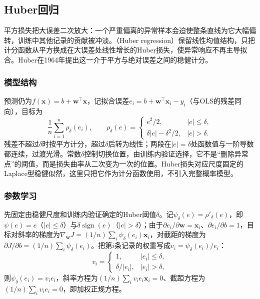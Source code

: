 \subsection{Huber回归}
\label{sec:regression-huber}

平方损失把大误差二次放大：一个严重偏离的异常样本会迫使整条直线为它大幅偏转，训练中其他记录的贡献被冲淡。（Huber regression）保留线性均值结构，只把计分函数从平方换成在大误差处线性增长的Huber损失，使异常响应不再主导拟合。Huber在1964年提出这一介于平方与绝对误差之间的稳健计分。

\subsubsection{模型结构}
\label{sec:regression-huber-structure}

预测仍为$f(\bm{x})=b+\bm{w}^{\top}\bm{x}$，记拟合误差$e_i=b+\bm{w}^{\top}\bm{x}_i-y_i$（与OLS的残差同向），目标为
\begin{equation}
  \frac{1}{n}\sum_{i=1}^n\rho_\delta(e_i),
  \qquad
  \rho_\delta(e)=
  \begin{cases}
    e^2/2,&|e|\leq\delta,\\
    \delta|e|-\delta^2/2,&|e|>\delta.
  \end{cases}
  \label{eq:regression-huber-loss}
\end{equation}
残差不超过$\delta$时按平方计分，超过$\delta$后转为线性；两段在$|e|=\delta$处函数值与一阶导数都连续，过渡光滑。常数$\delta$控制切换位置，由训练内验证选择，它不是“删除异常点”的阈值，而是损失曲率从二次变为一次的位置。Huber损失对应尺度固定的Laplace型稳健似然，这里只把它作为计分函数使用，不引入完整概率模型。

\subsubsection{参数学习}
\label{sec:regression-huber-learning}

先固定由稳健尺度和训练内验证确定的Huber阈值$\delta$。记$\psi_\delta(e)=\rho'_\delta(e)$，即$\psi(e)=e$（$|e|\leq\delta$）与$\delta\operatorname{sign}(e)$（$|e|>\delta$）；由于$\partial e_i/\partial\bm{w}=\bm{x}_i$、$\partial e_i/\partial b=1$，目标对斜率的梯度为$\nabla_{\bm w}J=(1/n)\sum_i\psi_\delta(e_i)\bm{x}_i$，对截距的梯度为$\partial J/\partial b=(1/n)\sum_i\psi_\delta(e_i)$。把第$i$条记录的权重写成$v_i=\psi_\delta(e_i)/e_i$：
\[
v_i=
  \begin{cases}
    1,&|e_i|\leq\delta,\\
    \delta/|e_i|,&|e_i|>\delta,
  \end{cases}
\]
则$\psi_\delta(e_i)=v_i e_i$，斜率方程为$(1/n)\sum_i v_i e_i\bm{x}_i=0$、截距方程为$(1/n)\sum_i v_i e_i=0$，即加权正规方程。

